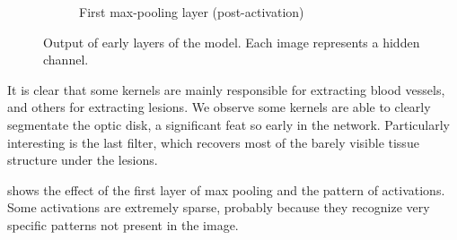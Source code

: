 \begin{figure}[tb]
\begin{subfigure}[b]{0.49\textwidth}
        \caption{First max-pooling layer (post-activation)}
        \label{fig:activations}
     \end{subfigure}
    \caption{Output of early layers of the model. Each image represents a hidden channel. }
    \label{fig:layer_output}
\end{figure}

It is clear that some kernels are mainly responsible for extracting blood vessels, and others for extracting lesions. We observe some kernels are able to clearly segmentate the optic disk, a significant feat so early in the network.  Particularly interesting is the last filter, which recovers most of the barely visible tissue structure under the lesions.

 shows the effect of the first layer of max pooling and the pattern of activations. Some activations are extremely sparse, probably because they recognize very specific patterns not present in the image.
